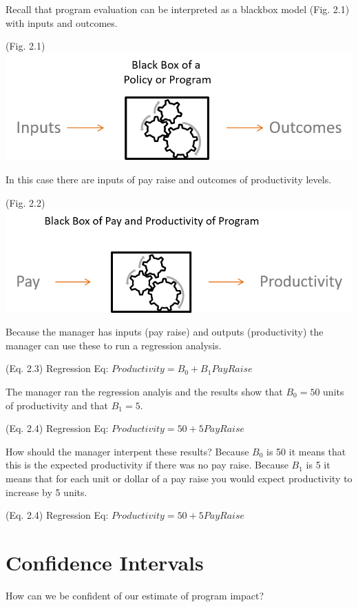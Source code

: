 \documentclass[]{book}
\theoremstyle{definition}
\theoremstyle{definition}
\theoremstyle{definition}
\theoremstyle{remark}
\begin{document}
Recall that program evaluation can be interpreted as a blackbox model
(Fig. 2.1) with inputs and outcomes.

(Fig. 2.1) \includegraphics{figures/Input_Output_Blackbox.png}

In this case there are inputs of pay raise and outcomes of productivity
levels.

(Fig. 2.2) \includegraphics{figures/Pay_Productivity_Blackbox.png}

Because the manager has inputs (pay raise) and outputs (productivity)
the manager can use these to run a regression analysis.

(Eq. 2.3) Regression Eq: \(Productivity = B_{0} + B_{1}Pay Raise\)

The manager ran the regression analyis and the results show that
\(B_{0} = 50\) units of productivity and that \(B_{1} = 5\).

(Eq. 2.4) Regression Eq: \(Productivity = 50 + 5Pay Raise\)

How should the manager interpent these results? Because \(B_{0}\) is 50
it means that this is the expected productivity if there was no pay
raise. Because \(B_{1}\) is 5 it means that for each unit or dollar of a
pay raise you would expect productivity to increase by 5 units.

(Eq. 2.4) Regression Eq: \(Productivity = 50 + 5Pay Raise\)

\hypertarget{confidence-intervals}{%
\section{Confidence Intervals}\label{confidence-intervals}}

How can we be confident of our estimate of program impact?
\end{document}
